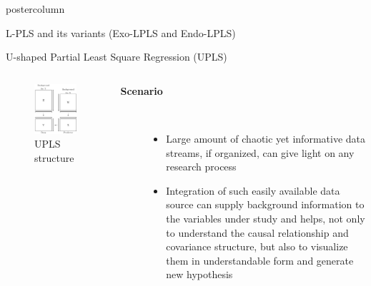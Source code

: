 \documentclass[9pt, final]{beamer}\usepackage[]{graphicx}\usepackage[]{color}
\begin{document}
\begin{frame}[fragile]
\begin{columns}
\begin{column}{.49\textwidth}
\begin{beamercolorbox}[center,wd=\textwidth]{postercolumn}
\begin{minipage}[T]{.98\textwidth}
{\begin{block}{L-PLS and its variants (Exo-LPLS and Endo-LPLS)}
            	
            \end{block}
            \vfill
            \begin{block}{U-shaped Partial Least Square Regression (UPLS)}
            	\begin{columns}[T, onlytextwidth]
	            		\begin{figure}[H]
		            	\centering
             			\includegraphics[width = \textwidth]{figure/upls}
             			\caption{UPLS structure}
             			\label{fig:upls}
	            		\end{figure}
			            \begin{description}
			            \item[\textbf{Scenario}]\hfill\\
			            \begin{itemize}
			            	\item Large amount of chaotic yet informative data streams, if organized, can give light on any research process
			            	\item Integration of such easily available data source can supply background information to the variables under study and helps, not only to understand the causal relationship and covariance structure, but also to visualize them in understandable form and generate new hypothesis

\end{itemize}
\end{description}
\end{columns}
\end{block}}
\end{minipage}
\end{beamercolorbox}
\end{column}
\end{columns}
\end{frame}
\end{document}
